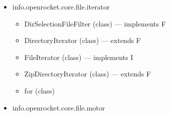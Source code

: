 \documentclass{amsdtx}
\begin{document}
\begin{itemize}
\begin{itemize}
\begin{itemize}
    \item
      AbstractRocketLoader (class) --- implements R
    \item
      AttachmentFactory (interface)
    \item
      AttachmentUtils (class)
    \item
      CSVExport (class)
    \item
      DatabaseMotorFinder (class) --- implements M
    \item
      DocumentLoadingContext (class)
    \item
      FileSystemAttachmentFactory (class) --- implements A
    \item
      GeneralRocketLoader (class)
    \item
      GeneralRocketSaver (class)
    \item
      Loader (interface)
    \item
      MotorFinder (interface)
    \item
      ProgressOutputStream (class) --- extends F
    \item
      RocketLoadException (class) --- extends E
    \item
      RocketLoader (interface)
    \item
      RocketSaver (class)
    \item
      SavingProgress (interface)
    \item
      TipShapeCode (class)
    \item
      UnknownFileTypeException (class) --- extends I
    \item
      ZipFileAttachmentFactory (class) --- implements A
    \end{itemize}
  \item
    info.openrocket.core.file.iterator

    \begin{itemize}
    
    \item
      DirSelectionFileFilter (class) --- implements F
    \item
      DirectoryIterator (class) --- extends F
    \item
      FileIterator (class) --- implements I
    \item
      ZipDirectoryIterator (class) --- extends F
    \item
      for (class)
    \end{itemize}
  \item
    info.openrocket.core.file.motor


\end{itemize}
\end{itemize}
\end{document}
